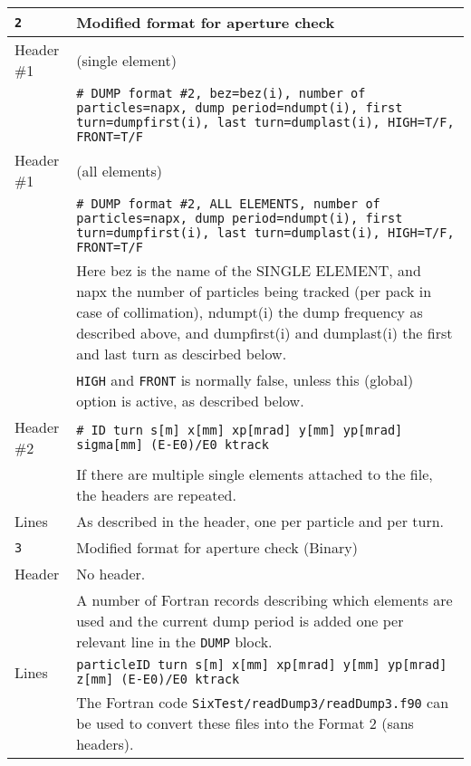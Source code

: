 \begin{center}
\begin{longtable}{|p{1.8cm}|p{13.8cm}|}
        \rowcolor{blue!15}
        \texttt{2} & Modified format for aperture check \\
        \hline
        Header \#1 & (single element)\\
                   & \texttt{\# DUMP format \#2, bez=\textcolor{blue!90}{bez(i)}, number of particles=\textcolor{blue!90}{napx}, dump period=\textcolor{blue!90}{ndumpt(i)}, first turn=\textcolor{blue!90}{dumpfirst(i)}, last turn=\textcolor{blue!90}{dumplast(i)}, HIGH=\textcolor{blue!90}{T/F}, FRONT=\textcolor{blue!90}{T/F}} \\
        \hline
        Header \#1  & (all elements)\\
                    & \texttt{\# DUMP format \#2, ALL ELEMENTS, number of particles=\textcolor{blue!90}{napx}, dump period=\textcolor{blue!90}{ndumpt(i)}, first turn=\textcolor{blue!90}{dumpfirst(i)}, last turn=\textcolor{blue!90}{dumplast(i)}, HIGH=\textcolor{blue!90}{T/F}, FRONT=\textcolor{blue!90}{T/F}}\vspace{1mm} \\
                    & Here \textcolor{blue!90}{bez} is the name of the SINGLE ELEMENT, and \textcolor{blue!90}{napx} the number of particles being tracked (per pack in case of collimation), \textcolor{blue!90}{ndumpt(i)} the dump frequency as described above, and \textcolor{blue!90}{dumpfirst(i)} and \textcolor{blue!90}{dumplast(i)} the first and last turn as descirbed below.\vspace{1mm} \\
                    & \texttt{HIGH} and \texttt{FRONT} is normally false, unless this (global) option is active, as described below.\\
        \hline
        Header \#2 & \texttt{\# ID turn s[m] x[mm] xp[mrad] y[mm] yp[mrad] sigma[mm] (E-E0)/E0 ktrack}\vspace{1mm} \\
                   & If there are multiple single elements attached to the file, the headers are repeated.\\
        \hline
        Lines      & As described in the header, one per particle and per turn. \\
        \hline

        \rowcolor{blue!15}
        \texttt{3} & Modified format for aperture check (Binary) \\
        \hline
        Header & No header.\vspace{1mm}\\
               & A number of Fortran records describing which elements are used and the current dump period is added one per relevant line in the \texttt{DUMP} block.\\
        \hline
	Lines  & \texttt{particleID turn s[m] x[mm] xp[mrad] y[mm] yp[mrad] z[mm] (E-E0)/E0 ktrack} \\
               & The Fortran code \texttt{SixTest/readDump3/readDump3.f90} can be used to convert these files into the Format 2 (sans headers). \\
        \hline


\end{longtable}
\end{center}
